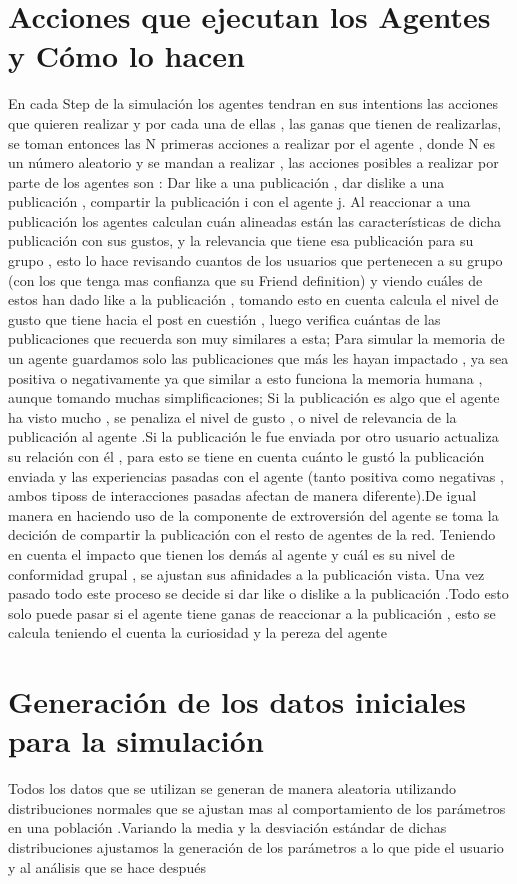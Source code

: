 \documentclass[acmtog]{acmart}
\begin{document}
\section{Acciones que ejecutan los Agentes y Cómo lo hacen}
En cada Step de la simulación los agentes tendran en sus intentions las acciones que quieren realizar y por cada una de ellas , las ganas que tienen de realizarlas, se toman entonces las N primeras acciones a realizar por el agente , donde N es un número aleatorio y se mandan a realizar , las acciones posibles a realizar por parte de los agentes son : Dar like a una publicación , dar dislike a una publicación , compartir la publicación i con el agente j. Al reaccionar a una publicación los agentes calculan cuán alineadas están las características de dicha publicación con sus gustos, y la relevancia que tiene esa publicación para su grupo , esto lo hace revisando cuantos de los usuarios que pertenecen a su grupo (con los que tenga mas confianza que su Friend definition) y viendo cuáles de estos han dado like a la publicación , tomando esto en cuenta calcula el nivel de gusto que tiene hacia el post en cuestión , luego verifica cuántas de las publicaciones que recuerda son muy similares a esta; Para simular la memoria de un agente guardamos solo las publicaciones que más les hayan impactado , ya sea positiva o negativamente ya que similar a esto funciona la memoria humana , aunque tomando muchas simplificaciones; Si la publicación es algo que el agente ha visto mucho , se penaliza el nivel de gusto , o nivel de relevancia de la publicación al agente .Si la publicación le fue enviada por otro usuario actualiza su relación con él , para esto se tiene en cuenta cuánto le gustó la publicación enviada y las experiencias pasadas con el agente (tanto positiva como negativas , ambos tiposs de interacciones pasadas afectan de manera diferente).De igual manera en haciendo uso de la componente de extroversión del agente se toma la decición de compartir la publicación con el resto de agentes de la red. Teniendo en cuenta el impacto que tienen los demás al agente y cuál es su nivel de conformidad grupal , se ajustan sus afinidades a la publicación vista. Una vez pasado todo este proceso se decide si dar like o dislike a la publicación .Todo esto solo puede pasar si el agente tiene ganas de reaccionar a la publicación , esto se calcula teniendo el cuenta la curiosidad y la pereza del agente

\section{Generación de los datos iniciales para la simulación}
Todos los datos que se utilizan se generan de manera aleatoria utilizando distribuciones normales que se ajustan mas al comportamiento de los parámetros en una población .Variando la media y la desviación estándar de dichas distribuciones ajustamos la generación de los parámetros a lo que pide el usuario y al análisis que se hace después 
\end{document}
